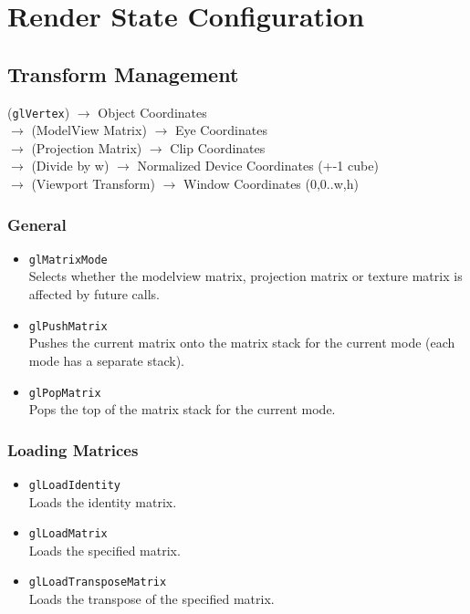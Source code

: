 \documentclass[12pt]{article}
\begin{document}
\section{Render State Configuration}



\subsection{Transform Management}

(\texttt{glVertex}) $\rightarrow$ Object Coordinates \\
$\rightarrow$ (ModelView Matrix) $\rightarrow$ Eye Coordinates \\
$\rightarrow$ (Projection Matrix) $\rightarrow$ Clip Coordinates \\
$\rightarrow$ (Divide by w) $\rightarrow$ Normalized Device Coordinates (+-1 cube) \\
$\rightarrow$ (Viewport Transform) $\rightarrow$ Window Coordinates (0,0..w,h)

\subsubsection{General}
\begin{itemize}
\item \texttt{glMatrixMode} \\
	Selects whether the modelview matrix, projection matrix or texture matrix is affected by future calls.
\item \texttt{glPushMatrix} \\
	Pushes the current matrix onto the matrix stack for the current mode (each mode has a separate stack).
\item \texttt{glPopMatrix} \\
	Pops the top of the matrix stack for the current mode.
\end{itemize}

\subsubsection{Loading Matrices}
\begin{itemize}
\item \texttt{glLoadIdentity} \\
	Loads the identity matrix.
\item \texttt{glLoadMatrix} \\
	Loads the specified matrix.
\item \texttt{glLoadTransposeMatrix} \\
	Loads the transpose of the specified matrix.
\end{itemize}
\end{document}
